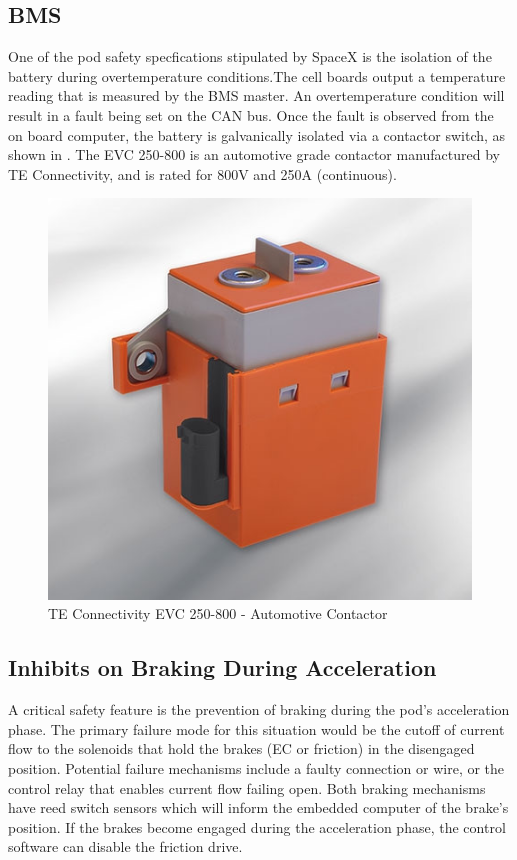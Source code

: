 \documentclass[main.tex]{subfiles}
\begin{document}
    \subsection{BMS}
    One of the pod safety specfications stipulated by SpaceX is the isolation of the battery during overtemperature conditions.The cell boards output a temperature reading that is measured by the BMS master. An overtemperature condition will result in a fault being set on the CAN bus. Once the fault is observed from the on board computer, the battery is galvanically isolated via a contactor switch, as shown in . The EVC 250-800 is an automotive grade contactor manufactured by TE Connectivity, and is rated for 800V and 250A (continuous).
    \begin{figure}[H]
        \centering
        \includegraphics[scale = 0.5]{images/contactor}
        \caption{TE Connectivity EVC 250-800 - Automotive Contactor }
        \label{fig:contactor}
    \end{figure}  
    
    \subsection{Inhibits on Braking During Acceleration}
    A critical safety feature is the prevention of braking during the pod's acceleration phase. The primary failure mode for this situation would be the cutoff of current flow to the solenoids that hold the brakes (EC or friction) in the disengaged position. Potential failure mechanisms include a faulty connection or wire, or the control relay that enables current flow failing open. Both braking mechanisms have reed switch sensors which will inform the embedded computer of the brake's position. If the brakes become engaged during the acceleration phase, the control software can disable the friction drive.
\end{document}
